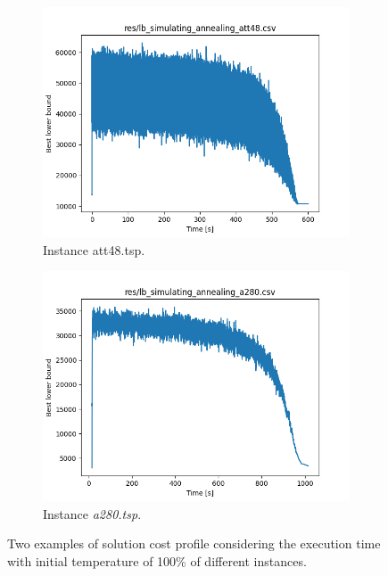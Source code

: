 \begin{figure}[!h]
	\begin{subfigure}{.5\columnwidth}
		\centering
		\includegraphics[width=\columnwidth]{../res/lb_simulating_annealing_100_att48.png}
		\caption{Instance att48.tsp.}
		\label{fig:sim_ann_att48}
	\end{subfigure}
	\begin{subfigure}{.5\columnwidth}
		\centering
		\includegraphics[width=\columnwidth]{../res/lb_simulating_annealing_100_a280.png}
		\caption{Instance \textit{a280.tsp}.}
		\label{fig:sim_ann_a280}
	\end{subfigure}
	\caption{Two examples of solution cost profile considering the execution time with initial temperature of 100\% of different instances.}
	\label{fig:sim_ann_dataset}
\end{figure}

